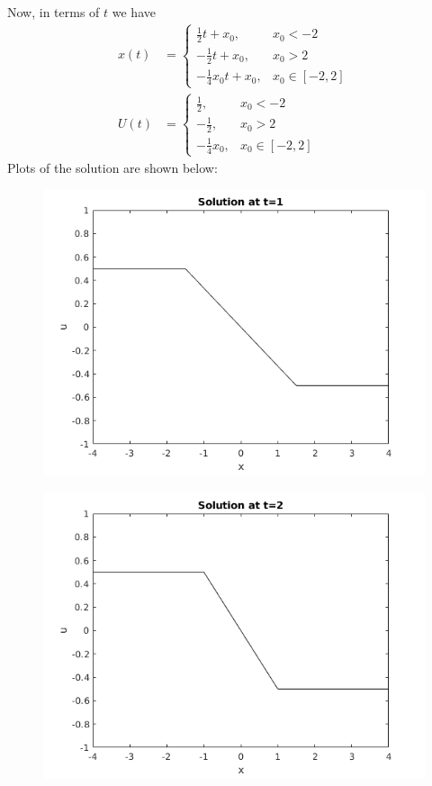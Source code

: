 \documentclass{article}
\begin{document}
Now, in terms of $t$ we have
%
\begin{align*}
    x(t) &=
        \begin{cases}
            \frac{1}{2} t + x_0, & x_0 < -2 \\
            -\frac{1}{2} t + x_0, & x_0 > 2 \\
            -\frac{1}{4} x_0 t + x_0, & x_0 \in [-2, 2]
        \end{cases}
    \\
    U(t) &=
        \begin{cases}
            \frac{1}{2}, & x_0 < -2 \\
            -\frac{1}{2}, & x_0 > 2 \\
            -\frac{1}{4} x_0, & x_0 \in [-2, 2]
        \end{cases}
\end{align*}
%
Plots of the solution are shown below:
%
\begin{figure}[H]
    \centering
    \includegraphics[width=12cm]{q2pa-1}
\end{figure}
%
\begin{figure}[H]
    \centering
    \includegraphics[width=12cm]{q2pa-2}
\end{figure}
\end{document}
